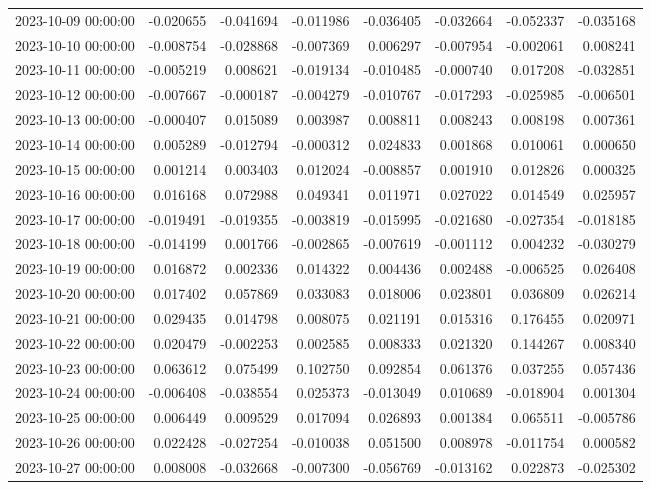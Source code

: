 \begin{tabular}{lrrrrrrr}
2023-10-09 00:00:00 & -0.020655 & -0.041694 & -0.011986 & -0.036405 & -0.032664 & -0.052337 & -0.035168 \\
2023-10-10 00:00:00 & -0.008754 & -0.028868 & -0.007369 & 0.006297 & -0.007954 & -0.002061 & 0.008241 \\
2023-10-11 00:00:00 & -0.005219 & 0.008621 & -0.019134 & -0.010485 & -0.000740 & 0.017208 & -0.032851 \\
2023-10-12 00:00:00 & -0.007667 & -0.000187 & -0.004279 & -0.010767 & -0.017293 & -0.025985 & -0.006501 \\
2023-10-13 00:00:00 & -0.000407 & 0.015089 & 0.003987 & 0.008811 & 0.008243 & 0.008198 & 0.007361 \\
2023-10-14 00:00:00 & 0.005289 & -0.012794 & -0.000312 & 0.024833 & 0.001868 & 0.010061 & 0.000650 \\
2023-10-15 00:00:00 & 0.001214 & 0.003403 & 0.012024 & -0.008857 & 0.001910 & 0.012826 & 0.000325 \\
2023-10-16 00:00:00 & 0.016168 & 0.072988 & 0.049341 & 0.011971 & 0.027022 & 0.014549 & 0.025957 \\
2023-10-17 00:00:00 & -0.019491 & -0.019355 & -0.003819 & -0.015995 & -0.021680 & -0.027354 & -0.018185 \\
2023-10-18 00:00:00 & -0.014199 & 0.001766 & -0.002865 & -0.007619 & -0.001112 & 0.004232 & -0.030279 \\
2023-10-19 00:00:00 & 0.016872 & 0.002336 & 0.014322 & 0.004436 & 0.002488 & -0.006525 & 0.026408 \\
2023-10-20 00:00:00 & 0.017402 & 0.057869 & 0.033083 & 0.018006 & 0.023801 & 0.036809 & 0.026214 \\
2023-10-21 00:00:00 & 0.029435 & 0.014798 & 0.008075 & 0.021191 & 0.015316 & 0.176455 & 0.020971 \\
2023-10-22 00:00:00 & 0.020479 & -0.002253 & 0.002585 & 0.008333 & 0.021320 & 0.144267 & 0.008340 \\
2023-10-23 00:00:00 & 0.063612 & 0.075499 & 0.102750 & 0.092854 & 0.061376 & 0.037255 & 0.057436 \\
2023-10-24 00:00:00 & -0.006408 & -0.038554 & 0.025373 & -0.013049 & 0.010689 & -0.018904 & 0.001304 \\
2023-10-25 00:00:00 & 0.006449 & 0.009529 & 0.017094 & 0.026893 & 0.001384 & 0.065511 & -0.005786 \\
2023-10-26 00:00:00 & 0.022428 & -0.027254 & -0.010038 & 0.051500 & 0.008978 & -0.011754 & 0.000582 \\
2023-10-27 00:00:00 & 0.008008 & -0.032668 & -0.007300 & -0.056769 & -0.013162 & 0.022873 & -0.025302 \\

\end{tabular}
